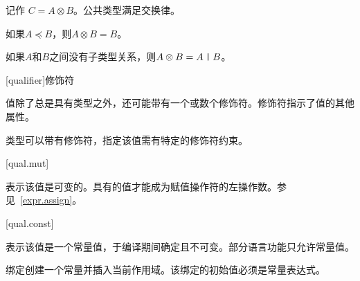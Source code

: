 记作 $C = A \otimes B$。公共类型满足交换律。

\pnum
如果$A \preceq B$，则$A \otimes B = B$。

\pnum
如果$A$和$B$之间没有子类型关系，则$A \otimes B = A \mathbin{\texttt{|}} B$。

[qualifier]{修饰符}

\pnum
值除了总是具有类型之外，还可能带有一个或数个修饰符。修饰符指示了值的其他属性。

\pnum
类型可以带有修饰符，指定该值需有特定的修饰符约束。

[qual.mut]{}

\pnum
{}表示该值是可变的。具有的值才能成为赋值操作符的左操作数。参见~\ref{expr.assign}。

[qual.const]{}

\pnum
{}表示该值是一个常量值，于编译期间确定且不可变。部分语言功能只允许常量值。

\pnum
{}绑定创建一个常量并插入当前作用域。该绑定的初始值必须是常量表达式。
